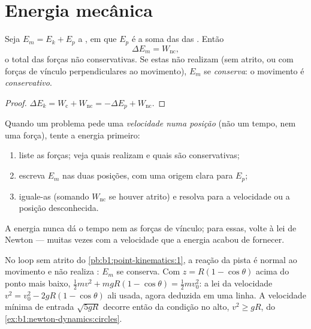 \section{Energia mecânica}

\begin{theorem}\label{thm:b1:work-and-energy:em}
Seja $E_m = E_k + E_p$ a \emph{}, em que $E_p$ é a
soma das  das . Então
\[
\Delta E_m = W_{\text{nc}} ,
\]
o  total das forças não conservativas. Se estas não realizam 
(sem atrito, ou com forças de vínculo perpendiculares ao movimento), $E_m$
se \emph{conserva}: o movimento é \emph{conservativo}.
\end{theorem}

\begin{proof}
$\Delta E_k = W_{\text{c}} + W_{\text{nc}} = -\Delta E_p + W_{\text{nc}}$.
\end{proof}

\begin{method}\label{met:b1:work-and-energy:method}
Quando um problema pede uma \emph{velocidade numa posição} (não um tempo, nem uma
força), tente a energia primeiro:
\begin{enumerate}
  \item liste as forças; veja quais realizam  e quais são conservativas;
  \item escreva $E_m$ nas duas posições, com uma origem clara para $E_p$;
  \item iguale-as (somando $W_{\text{nc}}$ se houver atrito) e resolva
        para a velocidade ou a posição desconhecida.
\end{enumerate}
A energia nunca dá o tempo nem as forças de vínculo; para essas, volte
à lei de Newton --- muitas vezes com a velocidade que a energia acabou de fornecer.
\end{method}

\begin{example}\label{ex:b1:work-and-energy:loop}
No loop sem atrito do \cref{pb:b1:point-kinematics:1}, a reação da pista
é normal ao movimento e não realiza : $E_m$ se conserva.
Com $z = R(1 - \cos\theta)$ acima do ponto mais baixo, $\tfrac12 mv^2 + mgR(1 -
\cos\theta) = \tfrac12 mv_0^2$: a lei da velocidade $v^2 = v_0^2 - 2gR(1 -
\cos\theta)$ ali usada, agora deduzida em uma linha. A velocidade mínima de
entrada $\sqrt{5gR}$ decorre então da condição no alto,
$v^2 \geq gR$, do \cref{ex:b1:newton-dynamics:circles}.
\end{example}

